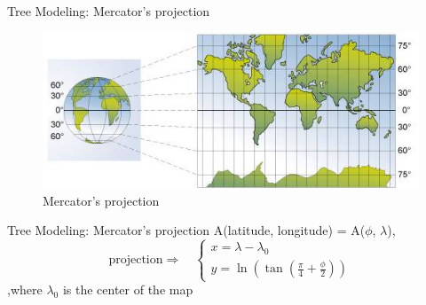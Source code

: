 \documentclass[10pt]{beamer}
\begin{document}
\begin{frame}{Tree Modeling: Mercator's projection}
	\begin{figure}[H]
	  \centering
	  \includegraphics[width=\textwidth]{images/mercator.jpg}
	  \caption{Mercator's projection\cite{img:mercator}}
  \end{figure}

  \end{frame}

  \begin{frame}{Tree Modeling: Mercator's projection}
	\Large
	A(latitude, longitude) = A($\phi$, $\lambda$),\\
	\begin{equation}
	  \text{projection} \Longrightarrow \quad
	  \left\{
	  \begin{array}{l}
		  x =  \lambda - \lambda_{0} \\
		  y =  \ln(\tan(\frac{\pi}{4} + \frac{\phi}{2}))
	  \end{array}
	  \right.
	\end{equation}
	\vfill
	,where $\lambda_{0}$ is the center of the map
  \end{frame}
\end{document}

